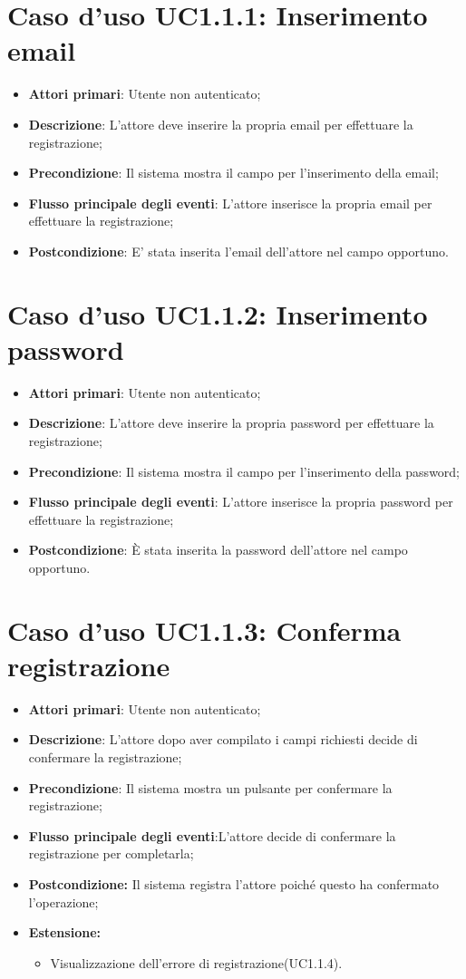 \section{Caso d'uso UC1.1.1: Inserimento email}
\begin{itemize}
	\item \textbf{Attori primari}: Utente non autenticato;
	\item \textbf{Descrizione}: L'attore deve inserire la propria email per effettuare la  registrazione;
	\item \textbf{Precondizione}: Il sistema mostra il campo per l'inserimento della email;
	\item \textbf{Flusso principale degli eventi}: L'attore inserisce la propria email per effettuare la registrazione;
	\item \textbf{Postcondizione}: E' stata inserita l'email dell'attore nel campo opportuno.
\end{itemize}
\section{Caso d'uso UC1.1.2: Inserimento password}
\begin{itemize}
	\item \textbf{Attori primari}: Utente non autenticato;
	\item \textbf{Descrizione}: L'attore deve inserire la propria password per effettuare la registrazione;
	\item \textbf{Precondizione}: Il sistema mostra il campo per l'inserimento della password;
	\item \textbf{Flusso principale degli eventi}: L'attore inserisce la propria password per effettuare la registrazione;
	\item \textbf{Postcondizione}: È stata inserita la password dell'attore nel campo opportuno.
\end{itemize}

\section{Caso d'uso UC1.1.3: Conferma registrazione}
\begin{itemize}
	\item \textbf{Attori primari}: Utente non autenticato;
	\item \textbf{Descrizione}: L'attore dopo aver compilato i campi richiesti decide di confermare  la registrazione;
	\item \textbf{Precondizione}: Il sistema mostra un pulsante per confermare la registrazione;
	\item \textbf{Flusso principale degli eventi}:L'attore decide di confermare la registrazione per completarla;
	\item \textbf{Postcondizione:} Il sistema registra l'attore poiché questo ha confermato l'operazione;
	\item \textbf{Estensione:}
	\begin{itemize}
		\item Visualizzazione dell'errore di registrazione(UC1.1.4).
	\end{itemize}
\end{itemize}


